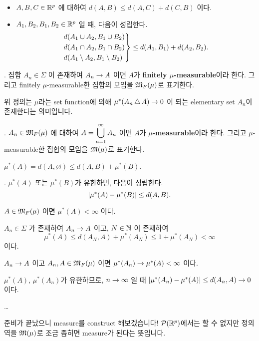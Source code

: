 \rmk
\begin{itemize}
    \item \(A, B, C \in \mathbb{R}^p\) 에 대하여 \(d(A, B) \leq d(A, C) + d(C, B)\) 이다.
    \item \(A_1, B_2, B_1, B_2 \in \mathbb{R}^p\) 일 때, 다음이 성립한다.
          \[
              \begin{rcases}
                  d(A_1 \cup A_2, B_1 \cup B_2) \\d(A_1 \cap A_2, B_1 \cap B_2) \\d(A_1 \setminus A_2, B_1 \setminus B_2)
              \end{rcases} \leq d(A_1, B_1) + d(A_2, B_2).
          \]
\end{itemize}

.  집합 \(A_n \in \Sigma\) 이 존재하여 \(A_n \rightarrow A\) 이면 \(A\)가 \textbf{finitely \(\mu\)-measurable}이라 한다. 그리고 finitely \(\mu\)-measurable한 집합의 모임을 \(\mathfrak{M}_F(\mu)\)로 표기한다.

위 정의는 \(\mu\)라는 set function에 의해 \(\mu^\ast (A_n \operatorname{\triangle} A) \rightarrow 0\) 이 되는 elementary set \(A_n\)이 존재한다는 의미입니다.

.  \(A_n \in \mathfrak{M}_F(\mu)\) 에 대하여 \(A = \displaystyle \bigcup_{n=1}^\infty A_n\) 이면 \(A\)가 \textbf{\(\mu\)-measurable}이라 한다. 그리고 \(\mu\)-measurable한 집합의 모임을 \(\mathfrak{M}(\mu)\)로 표기한다.

\rmk \(\mu^\ast(A) = d(A, \varnothing) \leq d(A, B) + \mu^\ast(B)\).

\prop. \(\mu^\ast(A)\) 또는 \(\mu^\ast(B)\)가 유한하면, 다음이 성립한다.
\[
    \left| \mu^\ast(A) - \mu^\ast(B) \right| \leq d(A, B).
\]

\cor \(A \in \mathfrak{M}_F(\mu)\) 이면 \(\mu^\ast(A) < \infty\) 이다.

\pf \(A_n \in \Sigma\) 가 존재하여 \(A_n \rightarrow A\) 이고, \(N \in \mathbb{N}\) 이 존재하여
\[
    \mu^\ast(A) \leq d(A_N, A) + \mu^\ast(A_N) \leq 1 + \mu^\ast(A_N) < \infty
\]
이다.

\cor \(A_n \rightarrow A\) 이고 \(A_n, A \in \mathfrak{M}_F(\mu)\) 이면 \(\mu^\ast(A_n)\rightarrow \mu^\ast(A) < \infty\) 이다.

\pf \(\mu^\ast(A)\), \(\mu^\ast(A_n)\)가 유한하므로, \(n \rightarrow \infty\) 일 때 \(\left| \mu^\ast(A_n) - \mu^\ast(A) \right| \leq d(A_n, A) \rightarrow 0\) 이다.

\dots

준비가 끝났으니 measure를 construct 해보겠습니다! \(\mathcal{P}(\mathbb{R}^p)\)에서는 할 수 없지만 정의역을 \(\mathfrak{M}(\mu)\)로 조금 좁히면 measure가 된다는 뜻입니다.

